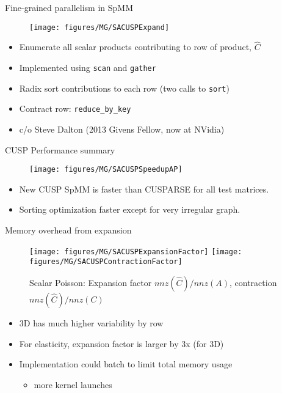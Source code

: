 \documentclass{beamer}
\begin{document}
\begin{frame}{Fine-grained parallelism in SpMM}
  \begin{figure}
    \centering
    \texttt{[image: figures/MG/SACUSPExpand]}
  \end{figure}
  \begin{itemize}
  \item Enumerate all scalar products contributing to row of product, $\hat C$
  \item Implemented using \texttt{scan} and \texttt{gather}
  \item Radix sort contributions to each row (two calls to \texttt{sort})
  \item Contract row: \texttt{reduce\_by\_key}
  \item c/o Steve Dalton (2013 Givens Fellow, now at NVidia)
  \end{itemize}
\end{frame}

\begin{frame}{CUSP Performance summary}
  \begin{figure}
    \centering
    \texttt{[image: figures/MG/SACUSPSpeedupAP]}
  \end{figure}  
  \begin{itemize}
  \item New CUSP SpMM is faster than CUSPARSE for all test matrices.
  \item Sorting optimization faster except for very irregular graph.
  \end{itemize}
\end{frame}

\begin{frame}{Memory overhead from expansion}
  \begin{figure}
    \centering
    \texttt{[image: figures/MG/SACUSPExpansionFactor]} \quad
    \texttt{[image: figures/MG/SACUSPContractionFactor]}
    \caption{Scalar Poisson: Expansion factor $nnz(\hat C)/nnz(A)$, contraction $nnz(\hat C)/nnz(C)$}
  \end{figure}
  \vspace{-2em}
  \begin{itemize}
  \item 3D has much higher variability by row
  \item For elasticity, expansion factor is larger by 3x (for 3D)
  \item Implementation could batch to limit total memory usage
    \begin{itemize}
    \item more kernel launches
    \end{itemize}
  \end{itemize}  
\end{frame}
\end{document}
